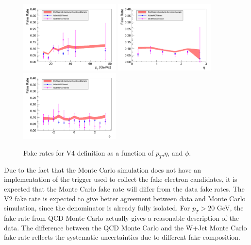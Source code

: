 \begin{figure}[!htbp]
\begin{center}
\includegraphics[width=0.45\textwidth]{figures/ElectronFakeRate_DenominatorV4_ptThreshold35_Pt.pdf}
\includegraphics[width=0.45\textwidth]{figures/ElectronFakeRate_DenominatorV4_ptThreshold35_Eta.pdf}
\includegraphics[width=0.45\textwidth]{figures/ElectronFakeRate_DenominatorV4_ptThreshold35_Phi.pdf}
\caption{Fake rates for V4 definition as a function of $p_T$,$\eta$, and $\phi$.}
\label{fig:ele_fr_V4_jet35}
\end{center}
\end{figure}

Due to the fact that the Monte Carlo simulation does not have an implementation of the trigger used
to collect the fake electron candidates, it is expected that the Monte Carlo fake rate will differ
from the data fake rates. The V2 fake rate is expected to give better agreement between data and 
Monte Carlo simulation, since the denominator is already fully isolated. For $p_{T} > 20$ GeV, 
the fake rate from QCD Monte Carlo actually gives a reasonable description of the data. The difference
between the QCD Monte Carlo and the W+Jet Monte Carlo fake rate reflects the systematic uncertainties
due to different fake composition.

